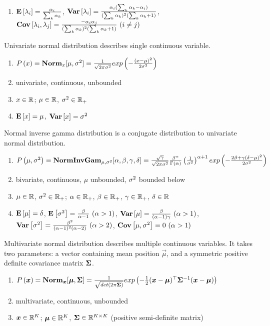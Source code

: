 \begin{description}[leftmargin=0cm]
\begin{enumerate}
		\item $\mathbf{E}\left[\lambda_i\right]=\frac{\alpha_i}{\sum_k\alpha_k}$, $\mathbf{Var}\left[\lambda_i\right]=\frac{\alpha_i(\sum_k\alpha_k-\alpha_i)}{(\sum_k\alpha_k)^2(\sum_k\alpha_k+1)}$, $\C{\la_i,\la_j}=\frac{-\al_i\al_j}{(\sum_k\al_k)^2(\sum_k\al_k+1)}\ (i \neq j)$
	\end{enumerate}
\item[Univariate Normal] Univariate normal distribution describes single continuous variable.
	\begin{enumerate}
		\item $P\left(x\right)=\mathbf{Norm}_x[\mu,\sigma^2]=\frac{1}{\sqrt{2\pi\sigma^2}}exp\left(-\frac{(x-\mu)^2}{2\sigma^2}\right)$
		\item univariate, continuous, unbounded
		\item $x \in \mathbb{R}$; $\mu \in \mathbb{R}$, $\sigma^2 \in \mathbb{R}_+$
		\item $\mathbf{E}\left[x\right]=\mu$, $\mathbf{Var}\left[x\right]=\sigma^2$
	\end{enumerate}
\item[Normal Inverse Gamma] Normal inverse gamma distribution is a conjugate distribution to univariate normal distribution.
	\begin{enumerate}
		\item $P\left(\mu,\sigma^2\right)=\mathbf{NormInvGam}_{\mu,\sigma^2}[\alpha,\beta,\gamma,\delta]=\frac{\sqrt{\gamma}}{\sqrt{2\pi\sigma^2}}\frac{\beta^\alpha}{\Gamma(\alpha)}\left(\frac{1}{\sigma^2}\right)^{\alpha+1}exp\left(-\frac{2\beta+\gamma(\delta-\mu)^2}{2\sigma^2}\right)$
		\item bivariate, continuous, $\mu$ unbounded, $\sigma^2$ bounded below
		\item $\mu \in \mathbb{R}$, $\sigma^2 \in \mathbb{R}_+$; $\alpha \in \mathbb{R}_+$, $\beta \in \mathbb{R}_+$, $\gamma \in \mathbb{R}_+$, $\delta \in \mathbb{R}$
		\item $\mathbf{E}\left[\mu\right]=\delta$, $\mathbf{E}\left[\sigma^2\right]=\frac{\beta}{\alpha-1}\ (\alpha>1)$, $\V{\mu}=\frac{\be}{(\al-1)\ga}\ (\al>1)$, $\V{\si^2}=\frac{\be^2}{(\al-1)^2(\al-2)}\ (\al>2)$, $\C{\mu,\si^2}=0\ (\al>1)$
	\end{enumerate}
\item[Multivariate Normal] Multivariate normal distribution describes multiple continuous variables. It takes two parameters: a vector containing mean position $\vec{\mu}$, and a symmetric positive definite covariance matrix $\mathbf{\Sigma}$.
	\begin{enumerate}
		\item $P\left(\boldsymbol{x}\right)=\mathbf{Norm}_{\boldsymbol{x}}[\boldsymbol{\mu},\mathbf{\Sigma}]=\frac{1}{\sqrt{det(2\pi\mathbf{\Sigma})}}exp\left(-\frac{1}{2}(\boldsymbol{x}-\boldsymbol{\mu}){}^\top\mathbf{\Sigma}^{-1}(\boldsymbol{x}-\boldsymbol{\mu})\right)$
		\item multivariate, continuous, unbounded
		\item $\boldsymbol{x} \in \mathbb{R}^K$; $\boldsymbol{\mu} \in \mathbb{R}^K$, $\mathbf{\Sigma} \in \mathbb{R}^{K \times K}$ (positive semi-definite matrix)

\end{enumerate}
\end{description}
